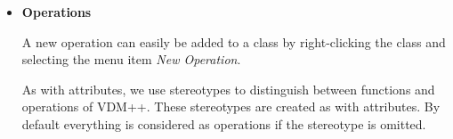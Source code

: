 \documentclass[\pformat,12pt]{article}
\newcommand{\vdmpp}{VDM++}
\begin{document}
\begin{itemize}
  We use {\it stereotypes}, as described in Section~\ref{mapping}, to
  distinguish the three different \vdmpp{} constructs.  You can assign
  a stereotype (indicated by ``{\tt <<}'' ``{\tt >>}'') to each
  attribute.  If you do not specify a stereotype the attribute will be
  considered as an instance variable by default.
  
  The \vdmpp{} add-in helps you in defining stereotypes for
  attributes.  Figure~\ref{fig:stereotype} shows the ``Attribute
  Specification'' window of a newly added attribute.  Because the
  class is assigned to the \vdmpp{} component, one can choose between
  the three predefined stereotypes, {\tt <<instance variable>>} or {\tt
    <<value>>}.


\begin{figure}[htb]
\begin{center}
\mbox{}
\caption{Selecting a predefined Stereotype for an Attribute.\label{fig:stereotype}}
\end{center}
\end{figure}

\item {\bf Operations}
  
  A new operation can easily be added to a class by right-clicking the
  class and selecting the menu item {\it New Operation}.

As with attributes, we use stereotypes to distinguish between
functions and operations of \vdmpp{}. These stereotypes are created as
with attributes. By default everything is considered as operations if the
stereotype is omitted.


\end{itemize}
\end{document}
